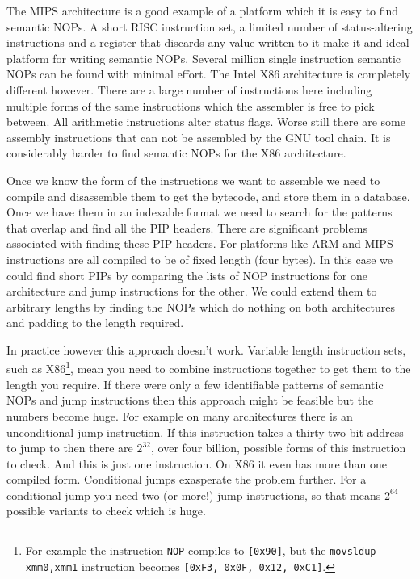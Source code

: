 \documentclass[10pt,]{book}
\begin{document}
The MIPS architecture\autocite{MIPSTechnologiesInc:2011ta} is a good
example of a platform which it is easy to find semantic NOPs. A short
RISC instruction set, a limited number of status-altering instructions
and a register that discards any value written to it make it and ideal
platform for writing semantic NOPs. Several million single instruction
semantic NOPs can be found with minimal effort. The Intel X86
architecture\autocite{IntelCorporation:1997ta} is completely different
however. There are a large number of instructions here including
multiple forms of the same instructions which the assembler is free to
pick between. All arithmetic instructions alter status flags. Worse
still there are some assembly instructions that can not be assembled by
the GNU tool chain\autocite{Anonymous:td}. It is considerably harder to
find semantic NOPs for the X86 architecture.

Once we know the form of the instructions we want to assemble we need to
compile and disassemble them to get the bytecode, and store them in a
database. Once we have them in an indexable format we need to search for
the patterns that overlap and find all the PIP headers. There are
significant problems associated with finding these PIP headers. For
platforms like ARM\autocite{Seal:2000vd} and
MIPS\autocite{MIPSTechnologiesInc:2011ta} instructions are all compiled
to be of fixed length (four bytes). In this case we could find short
PIPs by comparing the lists of NOP instructions for one architecture and
jump instructions for the other. We could extend them to arbitrary
lengths by finding the NOPs which do nothing on both architectures and
padding to the length required.

In practice however this approach doesn't work. Variable length
instruction sets, such as X86\footnote{For example the instruction
  \lstinline!NOP! compiles to \lstinline![0x90]!, but the
  \lstinline!movsldup xmm0,xmm1! instruction becomes
  \lstinline![0xF3, 0x0F, 0x12, 0xC1]!.}, mean you need to combine
instructions together to get them to the length you require. If there
were only a few identifiable patterns of semantic NOPs and jump
instructions then this approach might be feasible but the numbers become
huge. For example on many architectures there is an unconditional jump
instruction. If this instruction takes a thirty-two bit address to jump
to then there are $2^{32}$, over four billion, possible forms of this
instruction to check. And this is just one instruction. On X86 it even
has more than one compiled form. Conditional jumps exasperate the
problem further. For a conditional jump you need two (or more!) jump
instructions, so that means $2^{64}$ possible variants to check which is
huge.
\end{document}
